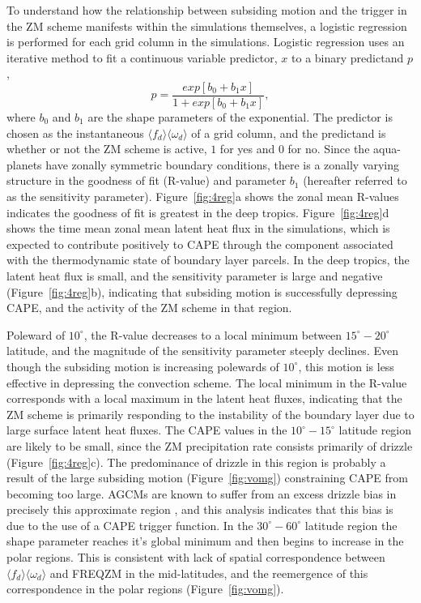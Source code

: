 To understand how the relationship between subsiding motion and the trigger in the ZM scheme manifests within the simulations themselves, a logistic regression is performed for each grid column in the simulations. Logistic regression uses an iterative method to fit a continuous variable predictor, $x$ to a binary predictand $p$ \citep{WILKSBOOK},
\begin{equation}
p = \frac{exp{[b_0 + b_1 x]}}{1 + exp{[b_0 + b_1 x]}}, \label{eq:eq6-3}
\end{equation}
where $b_0$ and $b_1$ are the shape parameters of the exponential. The predictor is chosen as the instantaneous $\langle f_{d} \rangle \langle \omega_{d} \rangle$ of a grid column, and the predictand is whether or not the ZM scheme is active, $1$ for yes and $0$ for no. Since the aqua-planets have zonally symmetric boundary conditions, there is a zonally varying structure in the goodness of fit (R-value) and parameter $b_1$ (hereafter referred to as the sensitivity parameter). Figure~\ref{fig:4reg}a shows the zonal mean R-values indicates the goodness of fit is greatest in the deep tropics. Figure~\ref{fig:4reg}d shows the time mean zonal mean latent heat flux in the simulations, which is expected to contribute positively to CAPE through the component associated with the thermodynamic state of boundary layer parcels. In the deep tropics, the latent heat flux is small, and the sensitivity parameter is large and negative (Figure~\ref{fig:4reg}b), indicating that subsiding motion is successfully depressing CAPE, and the activity of the ZM scheme in that region.

Poleward of $10^{\circ}$, the R-value decreases to a local minimum between $15^{\circ} - 20^{\circ}$ latitude, and the magnitude of the sensitivity parameter steeply declines. Even though the subsiding motion is increasing polewards of $10^{\circ}$, this motion is less effective in depressing the convection scheme. The local minimum in the R-value corresponds with a local maximum in the latent heat fluxes, indicating that the ZM scheme is primarily responding to the instability of the boundary layer due to large surface latent heat fluxes. The CAPE values in the $10^{\circ} - 15^{\circ}$ latitude region are likely to be small, since the ZM precipitation rate consists primarily of drizzle (Figure~\ref{fig:4reg}c). The predominance of drizzle in this region is probably a result of the large subsiding motion (Figure~\ref{fig:vomg}) constraining CAPE from becoming too large. AGCMs are known to suffer from an excess drizzle bias in precisely this approximate region \citep{D2006JCLIM}, and this analysis indicates that this bias is due to the use of a CAPE trigger function. In the $30^{\circ} - 60^{\circ}$ latitude region the shape parameter reaches it's global minimum and then begins to increase in the polar regions. This is consistent with lack of spatial correspondence between $\langle f_{d} \rangle \langle \omega_{d} \rangle$ and FREQZM in the mid-latitudes, and the reemergence of this correspondence in the polar regions (Figure~\ref{fig:vomg}).


